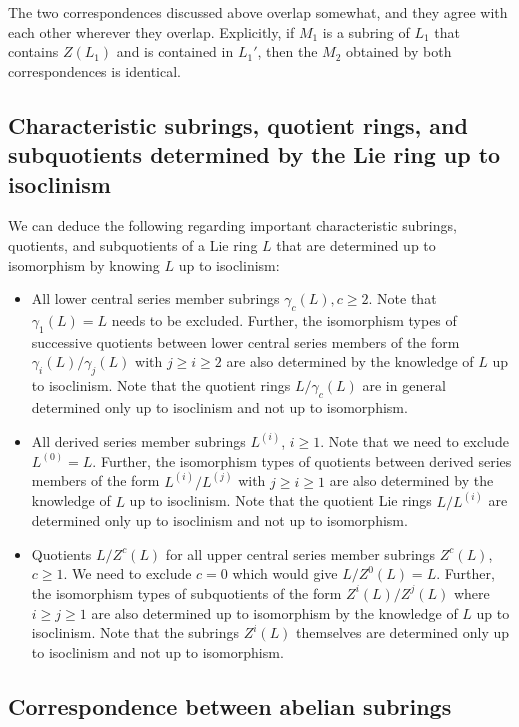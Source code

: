 \documentclass{ucetd}
\begin{document}
The two correspondences discussed above overlap somewhat, and they
agree with each other wherever they overlap. Explicitly, if $M_1$ is a
subring of $L_1$ that contains $Z(L_1)$ and is contained in $L_1'$,
then the $M_2$ obtained by both correspondences is identical.

\subsection{Characteristic subrings, quotient rings, and subquotients determined by the Lie ring up to isoclinism}

We can deduce the following regarding important characteristic
subrings, quotients, and subquotients of a Lie ring $L$ that are
determined up to isomorphism by knowing $L$ up to isoclinism:

\begin{itemize}
\item All lower central series member subrings $\gamma_c(L), c \ge
  2$. Note that $\gamma_1(L) = L$ needs to be excluded. Further, the
  isomorphism types of successive quotients between lower central
  series members of the form $\gamma_i(L)/\gamma_j(L)$ with $j \ge i
  \ge 2$ are also determined by the knowledge of $L$ up to
  isoclinism. Note that the quotient rings $L/\gamma_c(L)$ are in
  general determined only up to isoclinism and not up to isomorphism.

\item All derived series member subrings $L^{(i)}$, $i \ge 1$. Note
  that we need to exclude $L^{(0)} = L$. Further, the isomorphism
  types of quotients between derived series members of the form
  $L^{(i)}/L^{(j)}$ with $j \ge i \ge 1$ are also determined by the
  knowledge of $L$ up to isoclinism. Note that the quotient Lie rings
  $L/L^{(i)}$ are determined only up to isoclinism and not up to
  isomorphism.
\item Quotients $L/Z^c(L)$ for all upper central series member
  subrings $Z^c(L)$, $c \ge 1$. We need to exclude $c = 0$ which
  would give $L/Z^0(L) = L$. Further, the isomorphism types of
  subquotients of the form $Z^i(L)/Z^j(L)$ where $i \ge j \ge 1$ are
  also determined up to isomorphism by the knowledge of $L$ up to
  isoclinism. Note that the subrings $Z^i(L)$ themselves are
  determined only up to isoclinism and not up to isomorphism.
\end{itemize}

\subsection{Correspondence between abelian subrings}\label{sec:isoclinism-abelian-subrings}
\end{document}
